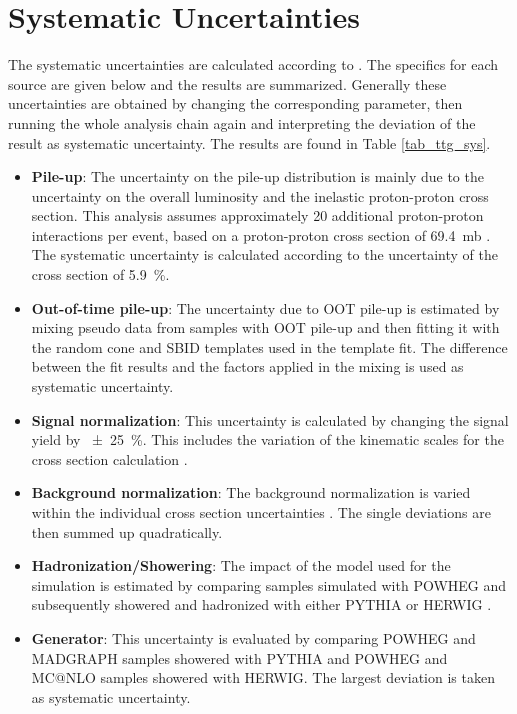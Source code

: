 \newpage
\section{Systematic Uncertainties}
\label{sec_ttg_sys}

The systematic uncertainties are calculated according to \cite{CMS-PAS-TOP-13-011}. The specifics for each source are given below and the results are summarized. Generally these uncertainties are obtained by changing the corresponding parameter, then running the whole analysis chain again and interpreting the deviation of the result as systematic uncertainty. The results are found in Table \ref{tab_ttg_sys}.

\begin{itemize}
\item \textbf{Pile-up}: The uncertainty on the pile-up distribution is mainly due to the uncertainty on the overall luminosity and the inelastic proton-proton cross section. This analysis assumes approximately 20 additional proton-proton interactions per event, based on a proton-proton cross section of \SI{69.4}{\milli \barn} \cite{Antchev:2011vs}. The systematic uncertainty is calculated according to the uncertainty of the cross section of \SI{5.9}{\percent}.  
\item \textbf{Out-of-time pile-up}: The uncertainty due to OOT pile-up is estimated by mixing pseudo data from samples with OOT pile-up and then fitting it with the random cone and SBID templates used in the template fit. The difference between the fit results and the factors applied in the mixing is used as systematic uncertainty.
\item \textbf{Signal normalization}: This uncertainty is calculated by changing the signal yield by \SI{\pm 25}{\percent}. This includes the variation of the kinematic scales for the cross section calculation \cite{Melnikov:2011ta}.
\item \textbf{Background normalization}: The background normalization is varied within the individual cross section uncertainties \cite{CMS-PAS-TOP-13-011}. The single deviations are then summed up quadratically.
\item \textbf{Hadronization/Showering}: The impact of the model used for the simulation is estimated by comparing samples simulated with POWHEG \cite{Alioli:2011as,Nason:2004rx,Frixione:2007vw,Alioli:2010xd} and subsequently showered and hadronized with either PYTHIA \cite{Sjostrand:2006za} or HERWIG \cite{Corcella:2000bw}.
\item \textbf{Generator}: This uncertainty is evaluated by comparing POWHEG and MADGRAPH samples showered with PYTHIA and POWHEG and MC@NLO \cite{Frixione:2002ik,Frixione:2003ei} samples showered with HERWIG. The largest deviation is taken as systematic uncertainty.

\end{itemize}
